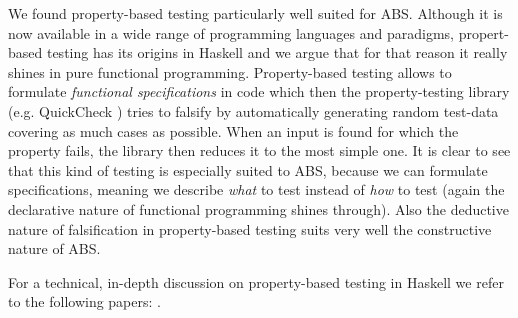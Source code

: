 We found property-based testing particularly well suited for ABS. Although it is now available in a wide range of programming languages and paradigms, propert-based testing has its origins in Haskell \citep{claessen_quickcheck:_2000, claessen_testing_2002} and we argue that for that reason it really shines in pure functional programming. Property-based testing allows to formulate \textit{functional specifications} in code which then the property-testing library (e.g. QuickCheck \citep{claessen_quickcheck:_2000}) tries to falsify by automatically generating random test-data covering as much cases as possible. When an input is found for which the property fails, the library then reduces it to the most simple one. It is clear to see that this kind of testing is especially suited to ABS, because we can formulate specifications, meaning we describe \textit{what} to test instead of \textit{how} to test (again the declarative nature of functional programming shines through). Also the deductive nature of falsification in property-based testing suits very well the constructive nature of ABS.

For a technical, in-depth discussion on property-based testing in Haskell we refer to the following papers: \citep{claessen_quickcheck:_2000, claessen_testing_2002}.


